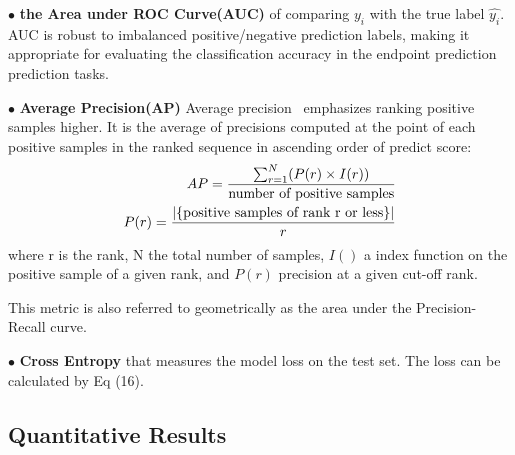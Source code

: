 \documentclass[letterpaper]{article} %
\begin{document}
$\bullet$ \textbf{the Area under ROC Curve(AUC)}
of comparing $y_i$ with the true label $\hat{y_i}$. AUC is robust to imbalanced positive/negative prediction labels, making it appropriate for evaluating the classification accuracy in the endpoint prediction prediction tasks.

$\bullet$ \textbf{Average Precision(AP)}
Average precision~\cite{turpin2006user} emphasizes ranking positive samples higher. It is the average of precisions computed at the point of each positive samples in the ranked sequence in ascending order of predict score:
\begin{align}
\setlength{\abovedisplayskip}{3pt}
AP = \frac{\sum_{r=1}^N (P(r) \times I(r))}{\mbox{number of positive samples}} \\
P(r) = \frac{|\{\mbox{positive samples of rank r or less}\}|}{r}
\setlength{\belowdisplayskip}{3pt}
\end{align}
where r is the rank, N the total number of samples, $I()$ a index function on the positive sample of a given rank, and $P(r)$ precision at a given cut-off rank.

This metric is also referred to geometrically as the area under the Precision-Recall curve.

$\bullet$ \textbf{Cross Entropy}
that measures the model loss on the test set. The loss can be calculated
by Eq (16).

\subsection{Quantitative Results}
\end{document}

